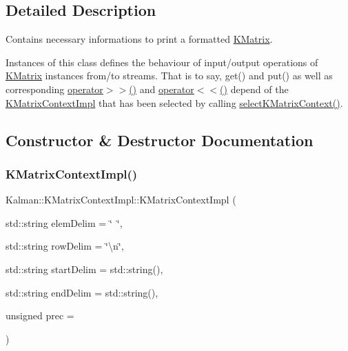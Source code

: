 \subsection{Detailed Description}
Contains necessary informations to print a formatted {\ttfamily \mbox{\hyperlink{classKalman_1_1KMatrix}{K\+Matrix}}}. 

Instances of this class defines the behaviour of input/output operations of {\ttfamily \mbox{\hyperlink{classKalman_1_1KMatrix}{K\+Matrix}}} instances from/to streams. That is to say, {\ttfamily get()} and {\ttfamily put()} as well as corresponding {\ttfamily \mbox{\hyperlink{namespaceKalman_a72ce00e837fa126ab3961f879e3d8b87}{operator$>$$>$()}}} and {\ttfamily \mbox{\hyperlink{namespaceKalman_a531684dadbec9b34313492f6d5121598}{operator$<$$<$()}}} depend of the {\ttfamily \mbox{\hyperlink{classKalman_1_1KMatrixContextImpl}{K\+Matrix\+Context\+Impl}}} that has been selected by calling {\ttfamily \mbox{\hyperlink{namespaceKalman_a1a0ed1b72b32aa8a1a12bb4212539807}{select\+K\+Matrix\+Context()}}}. 

\subsection{Constructor \& Destructor Documentation}
\mbox{\label{classKalman_1_1KMatrixContextImpl_adf1fa4ddf2cdac1fb694cf669f65c47b}} 
\subsubsection{\texorpdfstring{K\+Matrix\+Context\+Impl()}{KMatrixContextImpl()}}
{\footnotesize\ttfamily Kalman\+::\+K\+Matrix\+Context\+Impl\+::\+K\+Matrix\+Context\+Impl (\begin{DoxyParamCaption}\item[{std\+::string}]{elem\+Delim = {\ttfamily \char`\"{}~\char`\"{}},  }\item[{std\+::string}]{row\+Delim = {\ttfamily \char`\"{}\textbackslash{}n\char`\"{}},  }\item[{std\+::string}]{start\+Delim = {\ttfamily std\+:\+:string()},  }\item[{std\+::string}]{end\+Delim = {\ttfamily std\+:\+:string()},  }\item[{unsigned}]{prec = {} }\end{DoxyParamCaption})\hspace{0.3cm}{\ttfamily [inline]}}



